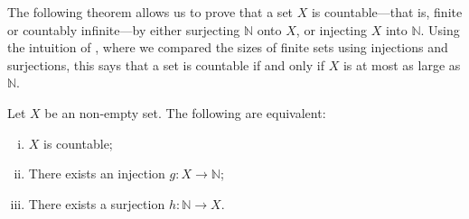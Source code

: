 The following theorem allows us to prove that a set $X$ is countable---that is, finite or countably infinite---by either surjecting $\mathbb{N}$ onto $X$, or injecting $X$ into $\mathbb{N}$. Using the intuition of , where we compared the sizes of finite sets using injections and surjections, this says that a set is countable if and only if $X$ is at most as large as $\mathbb{N}$.

\begin{theorem}
\label{thmCountableFromInjSurj}
Let $X$ be an non-empty set. The following are equivalent:
\begin{enumerate}[(i)]
\item $X$ is countable;
\item There exists an injection $g : X \to \mathbb{N}$;
\item There exists a surjection $h : \mathbb{N} \to X$.
\end{enumerate}
\end{theorem}


